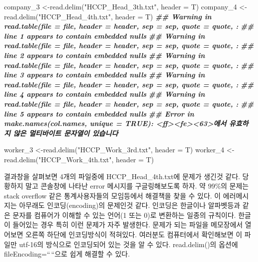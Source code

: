 \documentclass[
]{book}
\newenvironment{Shaded}{\begin{snugshade}}{\end{snugshade}}
\newcommand{\AttributeTok}[1]{\textcolor[rgb]{0.77,0.63,0.00}{#1}}
\newcommand{\DocumentationTok}[1]{\textcolor[rgb]{0.56,0.35,0.01}{\textbf{\textit{#1}}}}
\newcommand{\FunctionTok}[1]{\textcolor[rgb]{0.00,0.00,0.00}{#1}}
\newcommand{\NormalTok}[1]{#1}
\newcommand{\OtherTok}[1]{\textcolor[rgb]{0.56,0.35,0.01}{#1}}
\newcommand{\StringTok}[1]{\textcolor[rgb]{0.31,0.60,0.02}{#1}}
\theoremstyle{definition}
\theoremstyle{definition}
\theoremstyle{definition}
\theoremstyle{definition}
\theoremstyle{remark}
\begin{document}
\begin{Shaded}
\begin{Highlighting}[]
\NormalTok{company\_3 }\OtherTok{\textless{}{-}}\FunctionTok{read.delim}\NormalTok{(}\StringTok{"HCCP\_Head\_3th.txt"}\NormalTok{, }\AttributeTok{header =}\NormalTok{ T)}
\NormalTok{company\_4 }\OtherTok{\textless{}{-}}\FunctionTok{read.delim}\NormalTok{(}\StringTok{"HCCP\_Head\_4th.txt"}\NormalTok{, }\AttributeTok{header =}\NormalTok{ T)}
\DocumentationTok{\#\# Warning in read.table(file = file, header = header, sep = sep, quote = quote, :}
\DocumentationTok{\#\# line 1 appears to contain embedded nulls}
\DocumentationTok{\#\# Warning in read.table(file = file, header = header, sep = sep, quote = quote, :}
\DocumentationTok{\#\# line 2 appears to contain embedded nulls}
\DocumentationTok{\#\# Warning in read.table(file = file, header = header, sep = sep, quote = quote, :}
\DocumentationTok{\#\# line 3 appears to contain embedded nulls}
\DocumentationTok{\#\# Warning in read.table(file = file, header = header, sep = sep, quote = quote, :}
\DocumentationTok{\#\# line 4 appears to contain embedded nulls}
\DocumentationTok{\#\# Warning in read.table(file = file, header = header, sep = sep, quote = quote, :}
\DocumentationTok{\#\# line 5 appears to contain embedded nulls}
\DocumentationTok{\#\# Error in make.names(col.names, unique = TRUE): \textquotesingle{}\textless{}ff\textgreater{}\textless{}fe\textgreater{}\textless{}63\textgreater{}\textquotesingle{}에서 유효하지 않은 멀티바이트 문자열이 있습니다}

\NormalTok{worker\_3 }\OtherTok{\textless{}{-}}\FunctionTok{read.delim}\NormalTok{(}\StringTok{"HCCP\_Work\_3rd.txt"}\NormalTok{, }\AttributeTok{header =}\NormalTok{ T)}
\NormalTok{worker\_4 }\OtherTok{\textless{}{-}}\FunctionTok{read.delim}\NormalTok{(}\StringTok{"HCCP\_Work\_4th.txt"}\NormalTok{, }\AttributeTok{header =}\NormalTok{ T)}
\end{Highlighting}
\end{Shaded}

결과창을 살펴보면 4개의 파일중에 HCCP\_Head\_4th.txt에 문제가 생긴것 같다. 당황하지 말고 콘솔창에 나타난 error 메시지를 구글링해보도록 하자. 약 99\%의 문제는 stack overflow 같은 통계사용자들의 모임등에서 해결책을 찾을 수 있다. 이 에러메시지는 아무래도 인코딩(encoding)의 문제인것 같다. 인코딩은 한글이나 알파벳등과 같은 문자를 컴퓨어가 이해할 수 있는 언어(1 또는 0)로 변환하는 일종의 규칙이다. 한글이 들어있는 경우 특히 이런 문제가 자주 발생한다. 문제가 되는 파일을 메모장에서 열어보면 오른쪽 하단에 인코딩방식이 적혀있다. 여러분도 컴퓨터에서 확인해보면 이 파일만 utf-16의 방식으로 인코딩되어 있는 것을 알 수 있다. read.delim()의 옵션에 fileEncoding=``\,``으로 쉽게 해결할 수 있다.
\end{document}
